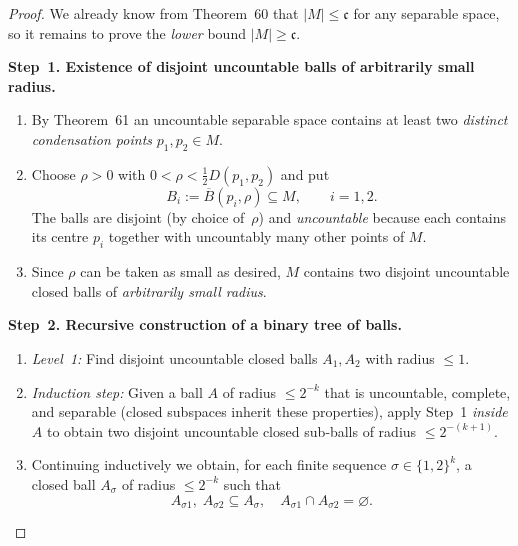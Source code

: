 \documentclass[12pt]{article}
\theoremstyle{definition} %
\theoremstyle{plain} %
\begin{document}
\begin{proof}
  We already know from Theorem~60 that
  $\lvert M\rvert\le\mathfrak c$ for any separable space,  
  so it remains to prove the \emph{lower} bound
  $\lvert M\rvert\ge\mathfrak c$.

  \medskip
  \noindent\textbf{Step 1.  Existence of disjoint uncountable balls of
  arbitrarily small radius.}

  \begin{enumerate}[label=\arabic*., leftmargin=2.8em]
      \item By Theorem~61 an uncountable separable space contains
            at least two \emph{distinct condensation points}
            $p_1,p_2\in M$.
      \item Choose $\rho>0$ with $0<\rho<\tfrac12D(p_1,p_2)$ and put
            \[
                B_i:=\overline{B}(p_i,\rho)\subseteq M,\qquad i=1,2 .
            \]
            The balls are disjoint (by choice of~$\rho$) and
            \emph{uncountable} because each contains its centre
            $p_i$ together with uncountably many other points of $M$.
      \item Since $\rho$ can be taken as small as desired,
            $M$ contains two disjoint uncountable closed balls
            of \emph{arbitrarily small radius}.
  \end{enumerate}

  \medskip
  \noindent\textbf{Step 2.  Recursive construction of a binary tree of balls.}

  \begin{enumerate}[label=\arabic*., leftmargin=2.8em]
      \item \emph{Level 1:}  
            Find disjoint uncountable closed balls
            $A_1,A_2$ with radius $\le 1$.
      \item \emph{Induction step:}  
            Given a ball $A$ of radius $\le 2^{-k}$ that is
            uncountable, complete, and separable
            (closed subspaces inherit these properties),
            apply Step 1 \emph{inside $A$} to obtain two
            disjoint uncountable closed sub‑balls of radius $\le 2^{-(k+1)}$.
      \item Continuing inductively we obtain, for each finite sequence
            $\sigma\in\{1,2\}^k$, a closed ball
            $A_\sigma$ of radius $\le 2^{-k}$ such that
            \[
                A_{\sigma 1},\;A_{\sigma 2}\subseteq A_\sigma,
                \quad
                A_{\sigma 1}\cap A_{\sigma 2}=\varnothing .
            \]
  \end{enumerate}


\end{proof}
\end{document}
